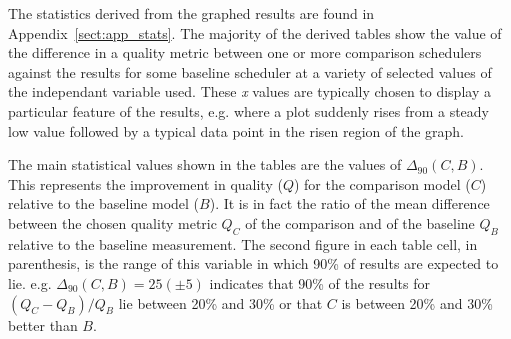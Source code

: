 The statistics derived from the graphed results are found in Appendix~\ref{sect:app_stats}. The majority of the derived tables show the value of the difference in a quality metric between one or more comparison schedulers against the results for some baseline scheduler at a variety of selected values of the independant variable used. These \emph{x} values are typically chosen to display a particular feature of the results, e.g. where a  plot suddenly rises from a steady low value followed by a typical data point in the risen region of the graph.

 The main statistical values shown in the tables are the values of $\Delta_{90}(C,B)$. This represents the improvement in quality ($Q$) for the comparison model ($C$) relative to the baseline model ($B$). It is in fact the ratio of the mean difference between the chosen quality metric $Q_C$ of the comparison and of the baseline $Q_B$ relative to the baseline measurement. The second figure in each table cell, in parenthesis, is the range of this variable in which 90\% of results are expected to lie. e.g. $\Delta_{90}(C,B) = 25 (\pm 5)$ indicates that 90\% of the results for $(Q_C-Q_B)/Q_B$ lie between 20\% and 30\% or that $C$ is between 20\% and 30\% better than $B$.

